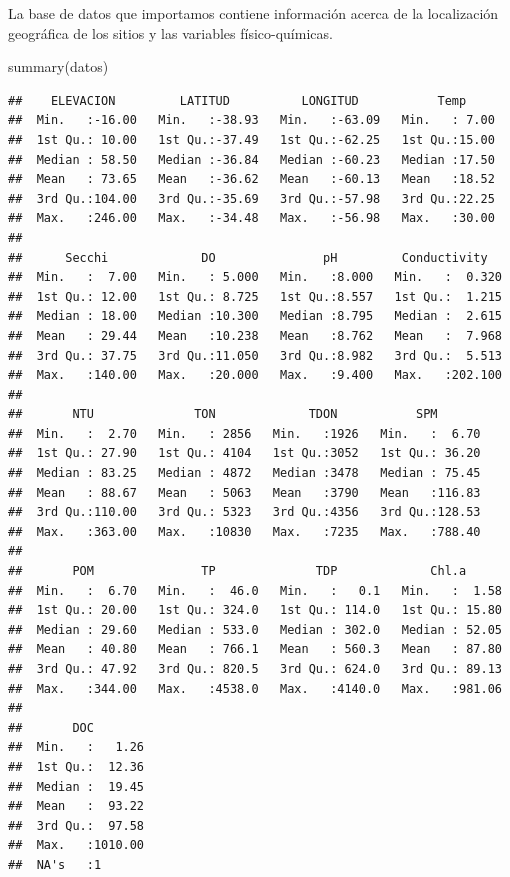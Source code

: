 \documentclass[
]{book}
\newenvironment{Shaded}{\begin{snugshade}}{\end{snugshade}}
\newcommand{\FunctionTok}[1]{\textcolor[rgb]{0.00,0.00,0.00}{#1}}
\newcommand{\NormalTok}[1]{#1}
\begin{document}
La base de datos que importamos contiene información acerca de la localización geográfica de los sitios y las variables físico-químicas.

\begin{Shaded}
\begin{Highlighting}[]
\FunctionTok{summary}\NormalTok{(datos)}
\end{Highlighting}
\end{Shaded}

\begin{verbatim}
##    ELEVACION         LATITUD          LONGITUD           Temp      
##  Min.   :-16.00   Min.   :-38.93   Min.   :-63.09   Min.   : 7.00  
##  1st Qu.: 10.00   1st Qu.:-37.49   1st Qu.:-62.25   1st Qu.:15.00  
##  Median : 58.50   Median :-36.84   Median :-60.23   Median :17.50  
##  Mean   : 73.65   Mean   :-36.62   Mean   :-60.13   Mean   :18.52  
##  3rd Qu.:104.00   3rd Qu.:-35.69   3rd Qu.:-57.98   3rd Qu.:22.25  
##  Max.   :246.00   Max.   :-34.48   Max.   :-56.98   Max.   :30.00  
##                                                                    
##      Secchi             DO               pH         Conductivity    
##  Min.   :  7.00   Min.   : 5.000   Min.   :8.000   Min.   :  0.320  
##  1st Qu.: 12.00   1st Qu.: 8.725   1st Qu.:8.557   1st Qu.:  1.215  
##  Median : 18.00   Median :10.300   Median :8.795   Median :  2.615  
##  Mean   : 29.44   Mean   :10.238   Mean   :8.762   Mean   :  7.968  
##  3rd Qu.: 37.75   3rd Qu.:11.050   3rd Qu.:8.982   3rd Qu.:  5.513  
##  Max.   :140.00   Max.   :20.000   Max.   :9.400   Max.   :202.100  
##                                                                     
##       NTU              TON             TDON           SPM        
##  Min.   :  2.70   Min.   : 2856   Min.   :1926   Min.   :  6.70  
##  1st Qu.: 27.90   1st Qu.: 4104   1st Qu.:3052   1st Qu.: 36.20  
##  Median : 83.25   Median : 4872   Median :3478   Median : 75.45  
##  Mean   : 88.67   Mean   : 5063   Mean   :3790   Mean   :116.83  
##  3rd Qu.:110.00   3rd Qu.: 5323   3rd Qu.:4356   3rd Qu.:128.53  
##  Max.   :363.00   Max.   :10830   Max.   :7235   Max.   :788.40  
##                                                                  
##       POM               TP              TDP             Chl.a       
##  Min.   :  6.70   Min.   :  46.0   Min.   :   0.1   Min.   :  1.58  
##  1st Qu.: 20.00   1st Qu.: 324.0   1st Qu.: 114.0   1st Qu.: 15.80  
##  Median : 29.60   Median : 533.0   Median : 302.0   Median : 52.05  
##  Mean   : 40.80   Mean   : 766.1   Mean   : 560.3   Mean   : 87.80  
##  3rd Qu.: 47.92   3rd Qu.: 820.5   3rd Qu.: 624.0   3rd Qu.: 89.13  
##  Max.   :344.00   Max.   :4538.0   Max.   :4140.0   Max.   :981.06  
##                                                                     
##       DOC         
##  Min.   :   1.26  
##  1st Qu.:  12.36  
##  Median :  19.45  
##  Mean   :  93.22  
##  3rd Qu.:  97.58  
##  Max.   :1010.00  
##  NA's   :1
\end{verbatim}
\end{document}

